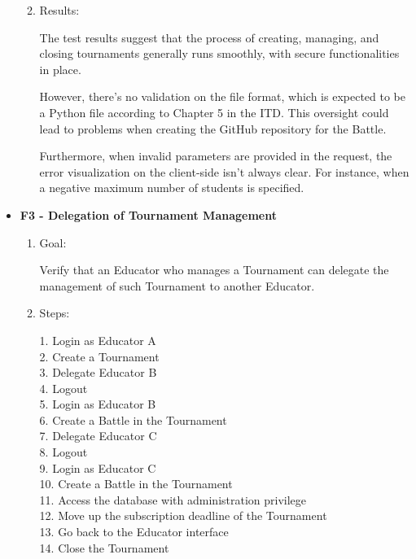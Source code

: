 \documentclass{Configuration_Files/Template}
\begin{document}
\begin{itemize}
\begin{enumerate}
\begin{enumerate}
        \end{enumerate}
        
        \item Results:
        
        The test results suggest that the process of creating, managing, and closing tournaments generally runs smoothly, with secure functionalities in place.

        However, there's no validation on the file format, which is expected to be a Python file according to Chapter 5 in the ITD. This oversight could lead to problems when creating the GitHub repository for the Battle.

        Furthermore, when invalid parameters are provided in the request, the error visualization on the client-side isn't always clear. For instance, when a negative maximum number of students is specified.\\
    
    \end{enumerate}
    
    \item \textbf{F3 - Delegation of Tournament Management}
    
    \begin{enumerate}
    
        \item Goal:
        
        Verify that an Educator who manages a Tournament can delegate the management of such Tournament to another Educator.
        
        \item Steps:
        
            1. Login as Educator A\\
            2. Create a Tournament\\
            3. Delegate Educator B\\
            4. Logout\\
            5. Login as Educator B\\
            6. Create a Battle in the Tournament\\
            7. Delegate Educator C\\
            8. Logout\\
            9. Login as Educator C\\
            10. Create a Battle in the Tournament\\
            11. Access the database with administration privilege\\
            12. Move up the subscription deadline of the Tournament\\
            13. Go back to the Educator interface\\
            14. Close the Tournament 
        

\end{enumerate}
\end{itemize}
\end{document}
